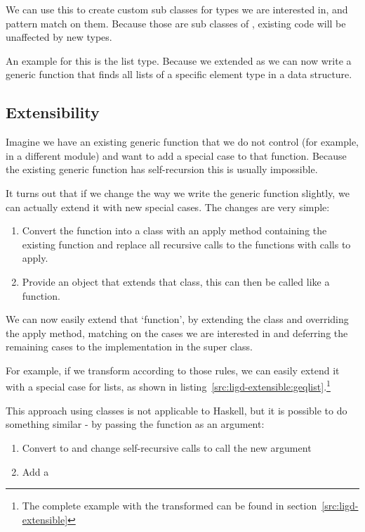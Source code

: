 We can use this to create custom sub classes for types we are interested
in, and pattern match on them. Because those are sub classes of ,
existing code will be unaffected by new types.

An example for this is the list type. Because we extended  as
 we can now write a generic function that finds all lists of a
specific element type in a data structure.

\subsection{Extensibility}
\label{lidg-extensible}
Imagine we have an existing generic function that we do not control (for example,
in a different module) and want to add a special case to that function. Because
the existing generic function has self-recursion this is usually impossible.

It turns out that if we change the way we write the generic function slightly,
we can actually extend it with new special cases. The changes are very simple:

\begin{enumerate}
  \item Convert the function into a class with an apply method containing the
        existing function and replace all recursive calls to the functions with
        calls to apply.
  \item Provide an object that extends that class, this can then be called like
        a function.
\end{enumerate}

We can now easily extend that `function', by extending the class and overriding
the apply method, matching on the cases we are interested in and deferring the
remaining cases to the implementation in the super class.

For example, if we transform  according to those rules, we can
easily extend it with a special case for lists, as shown in listing~\ref{src:ligd-extensible:geqlist}.\footnote{The complete example with the transformed  can be found in
section~\ref{src:ligd-extensible}}

This approach using classes is not applicable to Haskell, but it is possible
to do something similar - by passing the function as an argument:
\begin{enumerate}
  \item Convert  to
        and change self-recursive calls to call the new argument
  \item Add a  
\end{enumerate}

